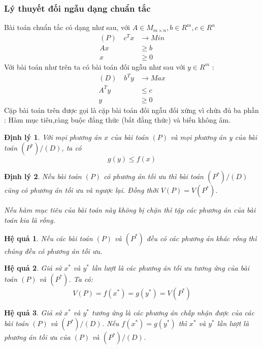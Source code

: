\documentclass{article}
\newtheorem{dl}{Định lý}
\newtheorem{hq}{Hệ quả}
\begin{document}
\subsubsection{Lý thuyết đối ngẫu dạng chuẩn tắc}
Bài toán chuẩn tắc có dạng như sau, với $A \in M_{m \times n},b \in R^m, c \in R^n$ \\ 
\begin{equation}
    \begin{split}
        (P) \quad c^Tx &\rightarrow Min \\
        Ax &\geq b \\
        x &\geq 0 
    \end{split}
\end{equation}
Với bài toán như trên ta có bài toán đối ngẫu như sau với $y \in R^m$ : \\
\begin{equation}
    \begin{split}
        (D) \quad b^Ty &\rightarrow Max \\
        A^Ty &\leq c \\
        y &\geq 0
    \end{split}
\end{equation}
Cặp bài toán trên được gọi là cặp bài toán đối ngẫu đối xứng vì chứa đủ ba phần : Hàm mục tiêu,ràng buộc đẳng thức (bất đẳng thức) và biến không âm. \\
\begin{dl}
    Với mọi phương án $x$ của bài toán $(P)$ và mọi phương án y của bài toán $(P^*)/(D)$, ta có $$g(y) \leq f(x)$$
\end{dl}
\begin{dl}
    \item Nếu bài toán $(P)$ có phương án tối ưu thì bài toán $(P^*)/(D)$ cũng có phương án tối ưu và ngược lại. Đồng thời $V(P)=V(P^*)$.
    \item Nếu hàm mục tiêu của bài toán này không bị chặn thì tập các phương án của bài toán kia là rỗng.
\end{dl}
\begin{hq}
    Nếu các bài toán $(P)$ và $(P^*)$ đều có các phương án khác rỗng thì chúng đều có phương án tối ưu.
\end{hq}
\begin{hq}
    Giả sử $x^*$ và $y^*$ lần lượt là các phương án tối ưu tương ứng của bài toán $(P)$ và $(P^*)$. Ta có:
   \[V(P)=f(x^*)=g(y^*)=V(P^*)\]
\end{hq}
\begin{hq}
    Giả sử $x^*$ và $y^*$ tương ứng là các phương án chấp nhận được của các bài toán $(P)$ và $(P^*)/(D)$. Nếu $f(x^*)=g(y^*)$ thì $x^*$ và $y^*$ lần lượt là phương án tối ưu của $(P)$ và $(P^*)/(D)$.
\end{hq}
\end{document}
